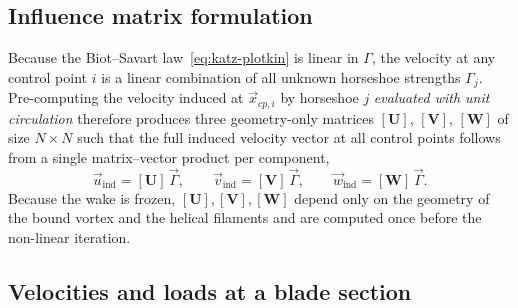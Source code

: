 \subsection{Influence matrix formulation}
\label{sec:influence-matrix}

Because the Biot--Savart law~\eqref{eq:katz-plotkin} is linear in $\Gamma$, the velocity at any control point $i$ is a linear combination of all unknown horseshoe strengths $\Gamma_j$. Pre-computing the velocity induced at $\vec{x}_{cp,i}$ by horseshoe $j$ \emph{evaluated with unit circulation} therefore produces three geometry-only matrices $[\mathbf{U}]$, $[\mathbf{V}]$, $[\mathbf{W}]$ of size $N\times N$ such that the full induced velocity vector at all control points follows from a single matrix--vector product per component,
\begin{equation}
\vec{u}_{\text{ind}} = [\mathbf{U}]\,\vec{\Gamma},\qquad
\vec{v}_{\text{ind}} = [\mathbf{V}]\,\vec{\Gamma},\qquad
\vec{w}_{\text{ind}} = [\mathbf{W}]\,\vec{\Gamma}.
\label{eq:influence-matrix}
\end{equation}
Because the wake is frozen, $[\mathbf{U}],[\mathbf{V}],[\mathbf{W}]$ depend only on the geometry of the bound vortex and the helical filaments and are computed once before the non-linear iteration.

\subsection{Velocities and loads at a blade section}
\label{sec:velocities-loads}

